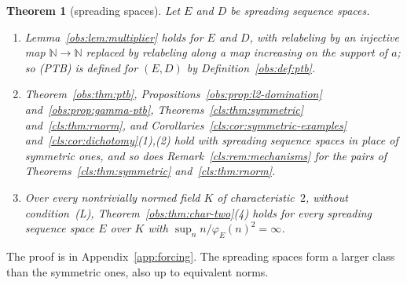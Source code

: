 \documentclass[11pt]{amsart}
\newtheorem{theorem}{Theorem}[section]
\theoremstyle{definition}
\theoremstyle{remark}
\numberwithin{equation}{section}
\newcommand{\N}{\mathbb N}
\theoremstyle{plain}
\theoremstyle{definition}
\theoremstyle{plain}
\begin{document}
\begin{theorem}[spreading spaces]\label{cls:thm:spreading}
Let $E$ and $D$ be spreading sequence spaces.
\begin{enumerate}
\item Lemma~\ref{obs:lem:multiplier} holds for $E$ and $D$, with relabeling by an injective map $\N\to\N$ replaced by
relabeling along a map increasing on the support of $a$; so \textup{(PTB)} is defined for $(E,D)$ by
Definition~\ref{obs:def:ptb}.
\item Theorem~\ref{obs:thm:ptb}, Propositions~\ref{obs:prop:l2-domination} and~\ref{obs:prop:gamma-ptb},
Theorems~\ref{cls:thm:symmetric} and~\ref{cls:thm:rnorm}, and Corollaries~\ref{cls:cor:symmetric-examples}
and~\ref{cls:cor:dichotomy}(1),(2) hold with spreading sequence spaces in place of symmetric ones, and so does
Remark~\ref{cls:rem:mechanisms} for the pairs of Theorems~\ref{cls:thm:symmetric} and~\ref{cls:thm:rnorm}.
\item Over every nontrivially normed field $K$ of characteristic~$2$, without condition~\textup{(L)},
Theorem~\ref{obs:thm:char-two}(4) holds for every spreading sequence space $E$ over $K$ with
$\sup_nn/\varphi_E(n)^2=\infty$.
\end{enumerate}
\end{theorem}

The proof is in Appendix~\ref{app:forcing}. The spreading spaces form a larger class than the symmetric ones, also up
to equivalent norms.
\end{document}
